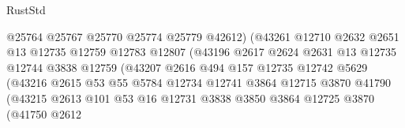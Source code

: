 \begin{lexlean}{RustStd}
\begin{coremodule}
                                      @25764
                                      @25767
                                      @25770
                                      @25774
                                      @25779
                                      @42612)
                                    (@43261
                                      @12710
                                      @2632
                                      @2651
                                      @13
                                      @12735
                                      @12759
                                      @12783
                                      @12807
                                      (@43196
                                        @2617
                                        @2624
                                        @2631
                                        @13
                                        @12735
                                        @12744
                                        @3838
                                        @12759
                                        (@43207
                                          @2616
                                          @494
                                          @157
                                          @12735
                                          @12742
                                          @5629
                                          (@43216
                                            @2615
                                            @53
                                            @55
                                            @5784
                                            @12734
                                            @12741
                                            @3864
                                            @12715
                                            @3870
                                            @41790
                                            (@43215
                                              @2613
                                              @101
                                              @53
                                              @16
                                              @12731
                                              @3838
                                              @3850
                                              @3864
                                              @12725
                                              @3870
                                              (@41750
                                                @2612

\end{coremodule}
\end{lexlean}
